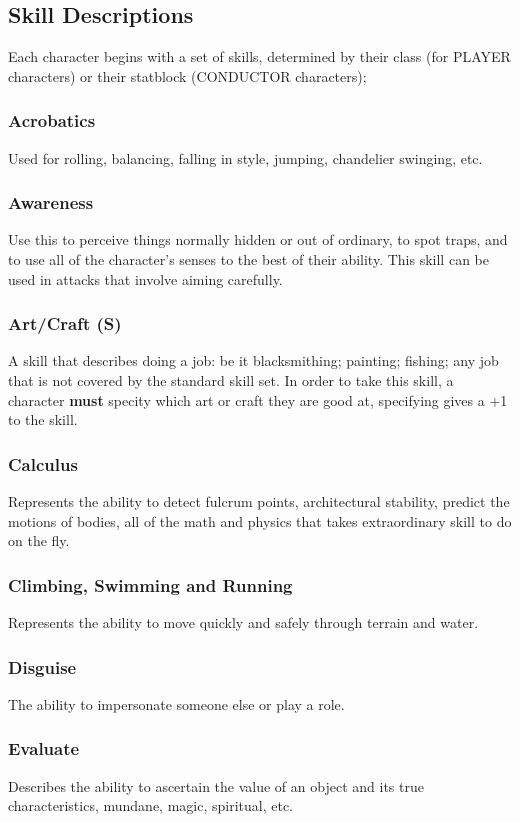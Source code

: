\subsection{Skill Descriptions}
Each character begins with a set of skills, determined by their class (for PLAYER characters) or their statblock (CONDUCTOR characters);
\begin{multicols}{2}
\subsubsection*{Acrobatics}
Used for rolling, balancing, falling in style, jumping, chandelier swinging, etc.
\subsubsection*{Awareness}
Use this to perceive things normally hidden or out of ordinary, to spot traps, and to use all of the character's senses to the best of their ability. This skill can be used in attacks that involve aiming carefully.
\subsubsection*{Art/Craft (S)}
A skill that describes doing a job: be it blacksmithing; painting; fishing; any job that is not covered by the standard skill set. In order to take this skill, a character \textbf{must} specity which art or craft they are good at, specifying gives a +1 to the skill.
\subsubsection*{Calculus}
Represents the ability to detect fulcrum points, architectural stability, predict the motions of bodies, all of the math and physics that takes extraordinary skill to do on the fly.
\subsubsection*{Climbing, Swimming and Running}
Represents the ability to move quickly and safely through terrain and water.
\subsubsection*{Disguise}
The ability to impersonate someone else or play a role.
\subsubsection*{Evaluate}
Describes the ability to ascertain the value of an object and its true characteristics, mundane, magic, spiritual, etc.

\end{multicols}

